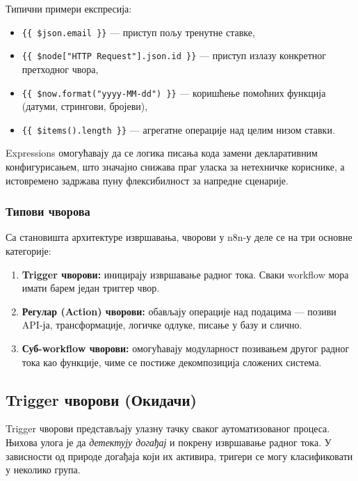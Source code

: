 Типични примери експресија:
\begin{itemize}
    \item \texttt{\{\{ \$json.email \}\}} — приступ пољу тренутне ставке,
    \item \texttt{\{\{ \$node["HTTP Request"].json.id \}\}} — приступ
    излазу конкретног претходног чвора,
    \item \texttt{\{\{ \$now.format("yyyy-MM-dd") \}\}} — коришћење
    помоћних функција (датуми, стрингови, бројеви),
    \item \texttt{\{\{ \$items().length \}\}} — агрегатне операције
    над целим низом ставки.
\end{itemize}

Expressions омогућавају да се логика писања кода замени
декларативним конфигурисањем, што значајно снижава праг уласка
за нетехничке кориснике, а истовремено задржава пуну флексибилност
за напредне сценарије.

\subsubsection{Типови чворова}

Са становишта архитектуре извршавања, чворови у n8n-у деле се
на три основне категорије:

\begin{enumerate}
    \item \textbf{Trigger чворови:} иницирају извршавање радног тока.
    Сваки workflow мора имати барем један триггер чвор.
    \item \textbf{Регулар (Action) чворови:} обављају операције
    над подацима — позиви API-ја, трансформације, логичке одлуке,
    писање у базу и слично.
    \item \textbf{Суб-workflow чворови:} омогућавају модуларност
    позивањем другог радног тока као функције, чиме се постиже
    декомпозиција сложених система.
\end{enumerate}

\subsection{Trigger чворови (Окидачи)}

Trigger чворови представљају улазну тачку сваког аутоматизованог
процеса. Њихова улога је да \textit{детектују догађај} и покрену
извршавање радног тока. У зависности од природе догађаја који
их активира, тригери се могу класификовати у неколико група.

